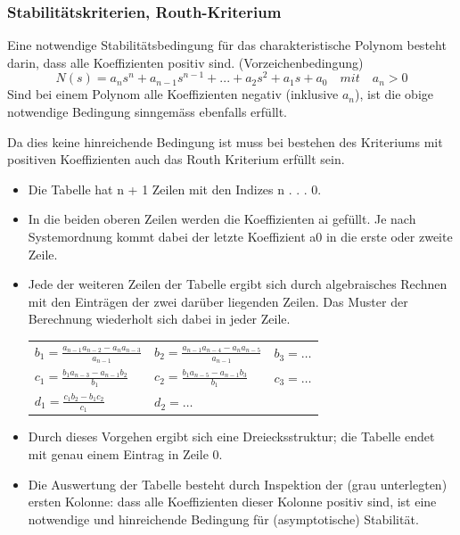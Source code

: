 \subsubsection{Stabilitätskriterien, Routh-Kriterium}

Eine notwendige Stabilitätsbedingung für das charakteristische Polynom besteht darin, dass alle Koeffizienten positiv sind. (Vorzeichenbedingung)
\begin{equation}
\boxed{N(s) = a_{n}s^n + a_{n-1}s^{n-1} + . . . + a_2s^2 + a_1s + a_0 \quad mit \quad a_n > 0}
\end{equation}
Sind bei einem Polynom alle Koeffizienten negativ (inklusive $a_n$), ist die obige
notwendige Bedingung sinngemäss ebenfalls erfüllt.



Da dies keine hinreichende Bedingung ist muss bei bestehen des Kriteriums mit positiven Koeffizienten auch das Routh Kriterium erfüllt sein.
\begin{itemize}
	\item Die Tabelle hat n + 1 Zeilen mit den Indizes n . . . 0.
	\item In die beiden oberen Zeilen werden die Koeffizienten ai gefüllt. Je nach Systemordnung
	kommt dabei der letzte Koeffizient a0 in die erste oder zweite Zeile.
	
	\item {Jede der weiteren Zeilen der Tabelle ergibt sich durch algebraisches Rechnen
	mit den Einträgen der zwei darüber liegenden Zeilen. Das Muster der Berechnung
	wiederholt sich dabei in jeder Zeile.\\
	\begin{tabularx}{\textwidth}{XXX}
	$b_1=\frac{a_{n-1}a_{n-2}-a_{n}a_{n-3}}{a_{n-1}}$
	& $b_2=\frac{a_{n-1}a_{n-4}-a_{n}a_{n-5}}{a_{n-1}}$
	& $b_3=\ldots$ \\
	$c_1=\frac{b_{1}a_{n-3}-a_{n-1}b_{2}}{b_{1}}$
	& $c_2=\frac{b_{1}a_{n-5}-a_{n-1}b_{3}}{b_{1}}$
	& $c_3=\ldots$ \\
	$d_1=\frac{c_{1}b_{2}-b_{1}c_{2}}{c_{1}}$
	& $d_2=\ldots$ & \\
	\end{tabularx}}
	\item Durch dieses Vorgehen ergibt sich eine Dreiecksstruktur; die Tabelle endet mit
	genau einem Eintrag in Zeile 0.
	\item Die Auswertung der Tabelle besteht durch Inspektion der (grau unterlegten)
	ersten Kolonne: dass alle Koeffizienten dieser Kolonne positiv sind, ist eine
	notwendige und hinreichende Bedingung für (asymptotische) Stabilität.
\end{itemize}
